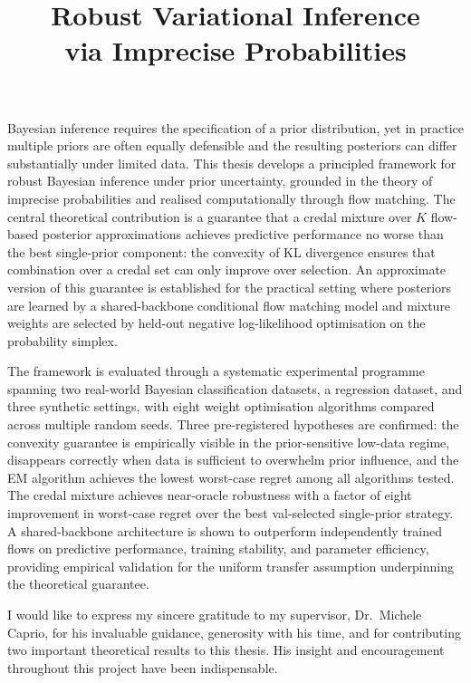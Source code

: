 \documentclass[12pt,MSc,wordcount,twoside,anon]{muthesis}
\theoremstyle{definition}
\theoremstyle{remark}
\begin{document}
\title{Robust Variational Inference \\
via Imprecise Probabilities}




\beforeabstract


\abstracttitle
{\singlespacing
Bayesian inference requires the specification of a prior 
distribution, yet in practice multiple priors are often 
equally defensible and the resulting posteriors can differ 
substantially under limited data. This thesis develops a 
principled framework for robust Bayesian inference under 
prior uncertainty, grounded in the theory of imprecise 
probabilities and realised computationally through flow 
matching. The central theoretical contribution is a 
guarantee that a credal mixture over $K$ flow-based 
posterior approximations achieves predictive performance 
no worse than the best single-prior component: the 
convexity of KL divergence ensures that combination over 
a credal set can only improve over selection. An 
approximate version of this guarantee is established for 
the practical setting where posteriors are learned by a 
shared-backbone conditional flow matching model and 
mixture weights are selected by held-out negative 
log-likelihood optimisation on the probability simplex.

The framework is evaluated through a systematic 
experimental programme spanning two real-world Bayesian 
classification datasets, a regression dataset, and three 
synthetic settings, with eight weight optimisation 
algorithms compared across multiple random seeds. Three 
pre-registered hypotheses are confirmed: the convexity 
guarantee is empirically visible in the prior-sensitive 
low-data regime, disappears correctly when data is 
sufficient to overwhelm prior influence, and the EM 
algorithm achieves the lowest worst-case regret among 
all algorithms tested. The credal mixture achieves 
near-oracle robustness with a factor of eight 
improvement in worst-case regret over the best 
val-selected single-prior strategy. A shared-backbone 
architecture is shown to outperform independently 
trained flows on predictive performance, training 
stability, and parameter efficiency, providing empirical 
validation for the uniform transfer assumption 
underpinning the theoretical guarantee.
}

\afterabstract

I would like to express my sincere gratitude to my 
supervisor, Dr.\ Michele Caprio, for his invaluable 
guidance, generosity with his time, and for 
contributing two important theoretical results 
to this thesis. His insight and encouragement 
throughout this project have been indispensable.
\end{document}
